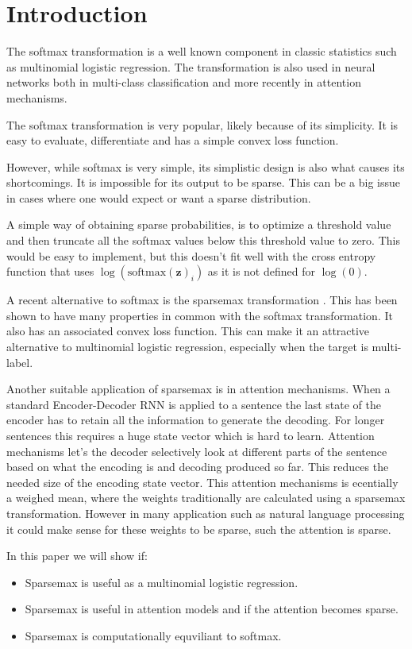 \section{Introduction}

The softmax transformation is a well known component in classic statistics such as multinomial logistic regression. The transformation is also used in neural networks both in multi-class classification and more recently in attention mechanisms.

The softmax transformation is very popular, likely because of its simplicity. It is easy to evaluate, differentiate and has a simple convex loss function.

However, while softmax is very simple, its simplistic design is also what causes its shortcomings. It is impossible for its output to be sparse. This can be a big issue in cases where one would expect or want a sparse distribution.

A simple way of obtaining sparse probabilities, is to optimize a threshold value and then truncate all the softmax values below this threshold value to zero. This would be easy to implement, but this doesn't fit well with the cross entropy function that uses $\log(\mathrm{softmax}(\mathbf{z})_i)$ as it is not defined for $\log(0)$.

A recent alternative to softmax is the sparsemax transformation \cite{sparsemax}. This has been shown to have many properties in common with the softmax transformation. It also has an associated convex loss function. This can make it an attractive alternative to multinomial logistic regression, especially when the target is multi-label.

Another suitable application of sparsemax is in attention mechanisms. When a standard Encoder-Decoder RNN is applied to a sentence the last state of the encoder has to retain all the information to generate the decoding. For longer sentences this requires a huge state vector which is hard to learn. Attention mechanisms let's the decoder selectively look at different parts of the sentence based on what the encoding is and decoding produced so far. This reduces the needed size of the encoding state vector. This attention mechanisms is ecentially a weighed mean, where the weights traditionally are calculated using a sparsemax transformation. However in many application such as natural language processing it could make sense for these weights to be sparse, such the attention is sparse.

In this paper we will show if:
\begin{itemize}
\item Sparsemax is useful as a multinomial logistic regression.
\item Sparsemax is useful in attention models and if the attention becomes sparse.
\item Sparsemax is computationally equviliant to softmax.
\end{itemize}
